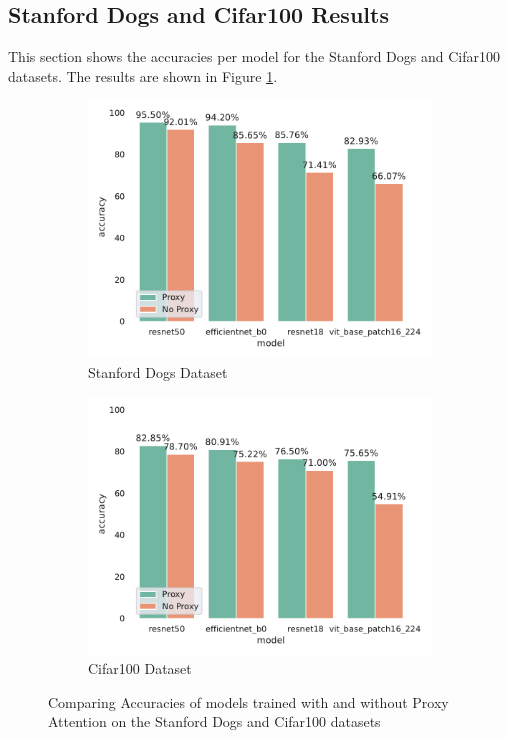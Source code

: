 \subsection{Stanford Dogs and Cifar100 Results}
This section shows the accuracies per model for the Stanford Dogs and Cifar100 datasets. The results are shown in Figure \ref{fig:dogs_cifar100_results}.
\begin{figure}[H]
    \begin{subfigure}[h]{.5\textwidth}
        \includegraphics[width=\linewidth, right]{results/dogs_results.pdf}
        \caption{Stanford Dogs Dataset}
    \end{subfigure}
    \begin{subfigure}[h]{.5\textwidth}
        \includegraphics[width=\linewidth, left]{results/cifar100_results.pdf}
        \caption{Cifar100 Dataset}
    \end{subfigure}
    \caption{Comparing Accuracies of models trained with and without Proxy Attention on the Stanford Dogs and Cifar100 datasets}
    \label{fig:dogs_cifar100_results}
\end{figure}


